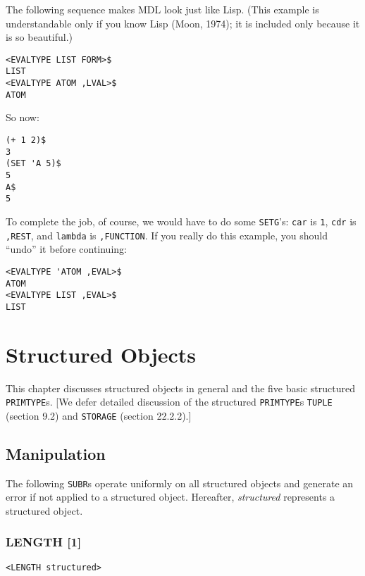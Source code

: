 \documentclass[a4paper]{scrbook}
\begin{document}
The following sequence makes MDL look just like Lisp. (This example is understandable only if you know Lisp (Moon, 1974);
it is included only because it is so beautiful.)

\begin{verbatim}
<EVALTYPE LIST FORM>$
LIST
<EVALTYPE ATOM ,LVAL>$
ATOM
\end{verbatim}

So now:

\begin{verbatim}
(+ 1 2)$
3
(SET 'A 5)$
5
A$
5
\end{verbatim}

To complete the job, of course, we would have to do some \texttt{SETG}'s: \texttt{car} is \texttt{1}, \texttt{cdr} is
\texttt{,REST}, and \texttt{lambda} is \texttt{,FUNCTION}. If you really do this example, you should ``undo'' it before
continuing:

\begin{verbatim}
<EVALTYPE 'ATOM ,EVAL>$
ATOM
<EVALTYPE LIST ,EVAL>$
LIST
\end{verbatim}

\chapter{Structured Objects}\label{chapter-7.-structured-objects}

This chapter discusses structured objects in general and the five basic structured \texttt{PRIMTYPE}s. {[}We defer detailed
discussion of the structured \texttt{PRIMTYPE}s \texttt{TUPLE} (section 9.2) and \texttt{STORAGE} (section 22.2.2).{]}

\section{Manipulation}\label{manipulation}

The following \texttt{SUBR}s operate uniformly on all structured objects and generate an error if not applied to a
structured object. Hereafter, \emph{structured} represents a structured object.

\subsection{LENGTH {[}1{]}}\label{length-1}

\begin{verbatim}
<LENGTH structured>
\end{verbatim}
\end{document}
